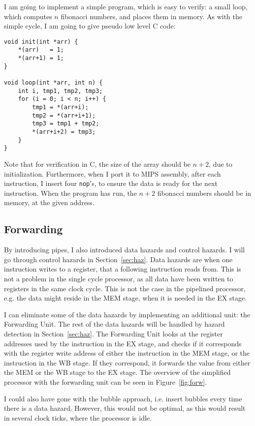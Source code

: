 I am going to implement a simple program, which is easy to verify: a small
loop, which computes $n$ fibonacci numbers, and places them in memory. As with
the simple cycle, I am going to give pseudo low level C code:
\begin{lstlisting}
void init(int *arr) {
    *(arr)   = 1;
    *(arr+1) = 1;
}

void loop(int *arr, int n) {
    int i, tmp1, tmp2, tmp3;
    for (i = 0; i < n; i++) {
        tmp1 = *(arr+i);
        tmp2 = *(arr+i+1);
        tmp3 = tmp1 + tmp2;
        *(arr+i+2) = tmp3;
    }
}
\end{lstlisting}
Note that for verification in C, the size of the array should be $n+2$, due to
initialization. Furthermore, when I port it to MIPS assembly, after each
instruction, I insert four \texttt{nop}'s, to ensure the data is ready for the
next instruction. When the program has run, the $n+2$ fibonacci numbers should
be in memory, at the given address.

\subsection{Forwarding}\label{sec:forw}
By introducing pipes, I also introduced data hazards and control hazards. I
will go through control hazards in Section~\ref{sec:haz}. Data hazards are when
one instruction writes to a register, that a following instruction reads from.
This is not a problem in the single cycle processor, as all data have been
written to registers in the same clock cycle. This is not the case in the
pipelined processor, e.g. the data might reside in the MEM stage, when it is
needed in the EX stage.

I can eliminate some of the data hazards by implementing an additional unit:
the Forwarding Unit. The rest of the data hazards will be handled by hazard
detection in Section~\ref{sec:haz}. The Forwarding Unit looks at the register
addresses used by the instruction in the EX stage, and checks if it corresponds
with the register write address of either the instruction in the MEM stage, or
the instruction in the WB stage. If they correspond, it forwards the value from
either the MEM or the WB stage to the EX stage. The overview of the simplified
processor with the forwarding unit can be seen in Figure~\ref{fig:forw}.

I could also have gone with the bubble approach, i.e. insert bubbles every
time there is a data hazard. However, this would not be optimal, as this would
result in several clock ticks, where the processor is idle.

